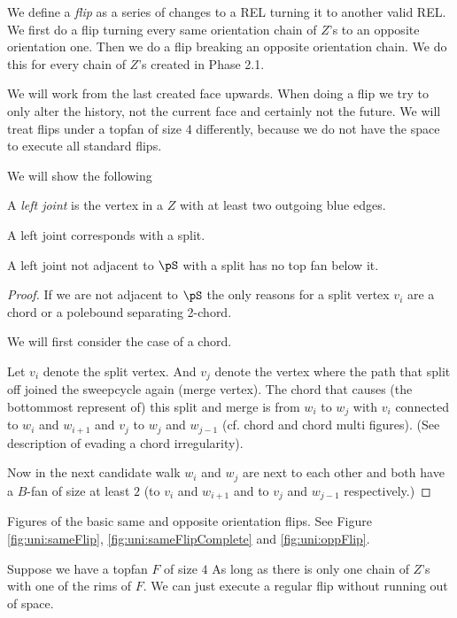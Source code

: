     We define a \emph{flip} as a series of changes to a REL turning it to another valid REL.
    We first do a flip turning every same orientation chain of $Z$'s to an opposite orientation one. Then we do a flip breaking an opposite orientation chain. We do this for every chain of $Z$'s created in Phase 2.1.

  We will work from the last created face upwards. When doing a flip we try to only alter the history, not the current face and certainly not the future. We will treat flips under a topfan of size 4 differently, because we do not have the space to execute all standard flips.

  We will show the following

  \begin{defi}
    A \emph{left joint} is the vertex in a $Z$ with at least two outgoing blue edges.
  \end{defi}

  A left joint corresponds with a split.

  \begin{lemma}
    \label{lm:}
    A left joint not adjacent to $\pS$ with a split has no top fan below it.
  \end{lemma}
  \begin{proof}
    If we are not adjacent to $\pS$ the only reasons for a split vertex $v_i$ are a chord or a polebound separating 2-chord.

    We will first consider the case of a chord.

    Let $v_i$ denote the split vertex. And $v_j$ denote the vertex where the path that split off joined the sweepcycle again (merge vertex). The chord that causes (the bottommost represent of) this split and merge is from $w_i$ to $w_j$ with $v_i$ connected to $w_i$ and $w_{i+1}$ and $v_j$ to $w_j$ and $w_{j-1}$ (cf. chord and chord multi figures). (See description of evading a chord irregularity).

    Now in the next candidate walk $w_i$ and $w_j$ are next to each other and both have a $B$-fan of size at least $2$ (to $v_i$ and $w_{i+1}$ and to $v_j$ and $w_{j-1}$ respectively.)

  \end{proof}

  Figures of the basic same and opposite orientation flips.
   See Figure \ref{fig:uni:sameFlip}, \ref{fig:uni:sameFlipComplete} and \ref{fig:uni:oppFlip}.

  Suppose we have a topfan $F$ of size $4$
  As long as there is only one chain of $Z$'s with one of the rims of $F$. We can just execute a regular flip without running out of space.




